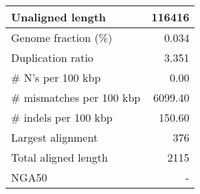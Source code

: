 \documentclass[12pt,a4paper]{article}
\begin{document}
\begin{table}[ht]
\begin{center}
\begin{tabular}{|l*{1}{|r}|}
Unaligned length & 116416 \\ \hline
Genome fraction (\%) & 0.034 \\ \hline
Duplication ratio & 3.351 \\ \hline
\# N's per 100 kbp & 0.00 \\ \hline
\# mismatches per 100 kbp & 6099.40 \\ \hline
\# indels per 100 kbp & 150.60 \\ \hline
Largest alignment & 376 \\ \hline
Total aligned length & 2115 \\ \hline
NGA50 & - \\ \hline
\end{tabular}
\end{center}
\end{table}
\end{document}
